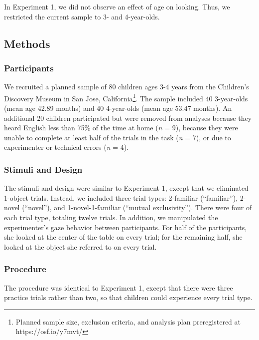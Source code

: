 \documentclass[10pt, letterpaper]{article}
\begin{document}
In Experiment 1, we did not observe an effect of age on looking. Thus,
we restricted the current sample to 3- and 4-year-olds.

\subsection{Methods}\label{methods-1}

\subsubsection{Participants}\label{participants-1}

We recruited a planned sample of 80 children ages 3-4 years from the
Children's Discovery Museum in San Jose,
California\footnote{Planned sample size, exclusion criteria, and analysis plan preregistered at https://osf.io/y7mvt/}.
The sample included 40 3-year-olds (mean age 42.89 months) and 40
4-year-olds (mean age 53.47 months). An additional 20 children
participated but were removed from analyses because they heard English
less than 75\% of the time at home (\emph{n} = 9), because they were
unable to complete at least half of the trials in the task (\emph{n} =
7), or due to experimenter or technical errors (\emph{n} = 4).

\subsubsection{Stimuli and Design}\label{stimuli-and-design-1}

The stimuli and design were similar to Experiment 1, except that we
eliminated 1-object trials. Instead, we included three trial types:
2-familiar (``familiar''), 2-novel (``novel''), and 1-novel-1-familiar
(``mutual exclusivity''). There were four of each trial type, totaling
twelve trials. In addition, we manipulated the experimenter's gaze
behavior between participants. For half of the participants, she looked
at the center of the table on every trial; for the remaining half, she
looked at the object she referred to on every trial.

\subsubsection{Procedure}\label{procedure-1}

The procedure was identical to Experiment 1, except that there were
three practice trials rather than two, so that children could experience
every trial type.
\end{document}

